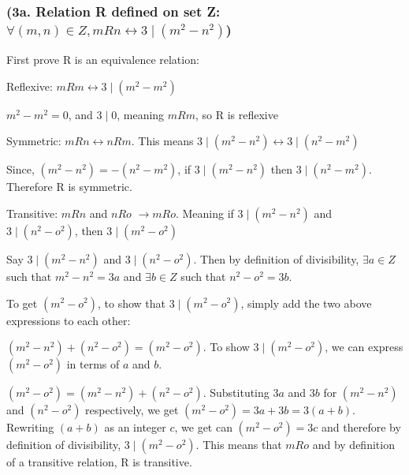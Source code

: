 \documentclass{article}
\begin{document}
\subsubsection{(3a. Relation R defined on set Z: $\forall (m, n) \in Z, m R n \leftrightarrow 3 \mid (m^{2} - n^{2})$)}

First prove R is an equivalence relation: \par\vspace{0.5cm}

\noindent Reflexive: $m R m \leftrightarrow 3 \mid (m^{2} - m^{2})$ \par\noindent
$m^{2} - m^{2} = 0$, and $3 \mid 0$, meaning $m R m$, so R is reflexive \par\vspace{0.5cm}

\noindent Symmetric: $m R n \leftrightarrow n R m$.  This means $3 \mid (m^{2} - n^{2}) \leftrightarrow 3 \mid (n^{2} - m^{2})$ \par\noindent
Since, $(m^{2} - n^{2}) = -(n^{2} - m^{2})$, if $3 \mid (m^{2} - n^{2})$ then $3 \mid (n^{2} - m^{2})$.  Therefore R is symmetric. \par\vspace{0.5cm}

\noindent Transitive: $m R n$ and $n R o$ $\rightarrow m R o$.  Meaning if $3 \mid (m^{2} - n^{2})$ and $3 \mid (n^{2} - o^{2})$, then $3 \mid (m^{2} - o^{2})$ \par\noindent Say $3 \mid (m^{2} - n^{2})$ and $3 \mid (n^{2} - o^{2})$.  Then by definition of divisibility, $\exists a \in Z$ such that $m^{2} - n^{2} = 3a$ and $\exists b \in Z$ such that $n^{2} - o^{2} = 3b$. \par\noindent To get $(m^{2} - o^{2})$, to show that $ 3 \mid (m^{2} - o^{2})$, simply add the two above expressions to each other: \par\noindent $(m^{2} - n^{2}) + (n^{2} - o^{2}) = (m^{2} - o^{2})$.
To show $ 3 \mid (m^{2} - o^{2})$, we can express $(m^{2} - o^{2})$ in terms of $a$ and $b$. \par\noindent
$(m^{2} - o^{2}) = (m^{2} - n^{2}) + (n^{2} - o^{2})$.  Substituting $3a$ and $3b$ for $(m^{2} - n^{2})$ and $(n^{2} - o^{2})$ respectively, we get $(m^{2} - o^{2}) = 3a + 3b = 3(a + b)$.  Rewriting $(a + b)$ as an integer $c$, we get can $(m^{2} - o^{2}) = 3c$ and therefore by definition of divisibility, $3 \mid (m^{2} - o^{2})$.  This means that $m R o$ and by definition of a transitive relation, R is transitive. \par\vspace{0.5cm}
\end{document}
